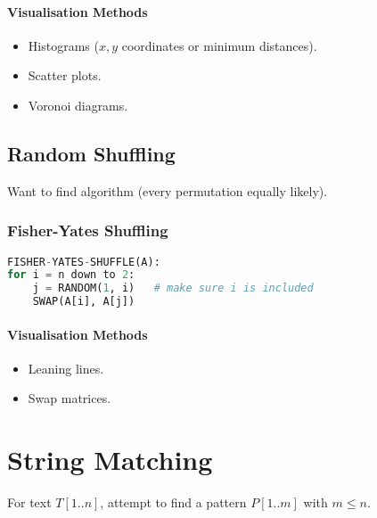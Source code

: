 \documentclass[twocolumn,english]{article}
\numberwithin{equation}{section}
\numberwithin{figure}{section}
\numberwithin{table}{section}
\let\emph\relax
\begin{document}
\paragraph{Visualisation Methods}
\begin{itemize}
\item Histograms ($x,y$ coordinates or minimum distances). 
\item Scatter plots. 
\item Voronoi diagrams. 
\end{itemize}

\subsection{Random Shuffling}

Want to find \emph{unbiased} algorithm (every permutation equally
likely).


\subsubsection*{Fisher-Yates Shuffling}

\begin{lstlisting}[language=Python,basicstyle={\footnotesize\ttfamily},tabsize=4,frame=single]
FISHER-YATES-SHUFFLE(A):
for i = n down to 2:
	j = RANDOM(1, i)   # make sure i is included
	SWAP(A[i], A[j])
\end{lstlisting}



\paragraph{Visualisation Methods}
\begin{itemize}
\item Leaning lines. 
\item Swap matrices. 
\end{itemize}

\section{String Matching}

For text $T\left[1..n\right]$, attempt to find a pattern $P\left[1..m\right]$
with $m\leq n$.
\end{document}
